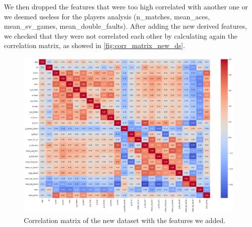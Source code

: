 We then dropped the features that were too high correlated with another one or we deemed useless for the players analysis (n\_matches, mean\_aces, mean\_sv\_games, mean\_double\_faults).
After adding the new derived features, we checked that they were not correlated each other by calculating again the correlation matrix, as showed in \autoref{fig:corr_matrix_new_ds}.

\begin{figure}[H]
    \centering
    \includegraphics[width=0.7\linewidth]{images/data_preparation/players_corr_features.png}
    \caption{Correlation matrix of the new dataset with the features we added.}
    \label{fig:corr_matrix_new_ds}
\end{figure}